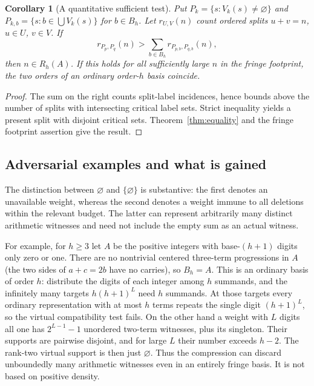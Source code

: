 \documentclass[11pt]{article}
\newtheorem{corollary}[theorem]{Corollary}
\theoremstyle{remark}\newtheorem{remark}[theorem]{Remark}
\begin{document}
\begin{corollary}[A quantitative sufficient test]\label{cor:overlap}
Put $P_k=\{s:V_k(s)\ne\varnothing\}$ and $P_{k,b}=\{s:b\in\bigcup V_k(s)\}$ for $b\in B_h$. Let $r_{U,V}(n)$ count ordered splits $u+v=n$, $u\in U$, $v\in V$. If
\[
 r_{P_p,P_q}(n)>\sum_{b\in B_h}r_{P_{p,b},P_{q,b}}(n),
\]
then $n\in R_h(A)$. If this holds for all sufficiently large $n$ in the fringe footprint, the two orders of an ordinary order-$h$ basis coincide.
\end{corollary}
\begin{proof}
The sum on the right counts split-label incidences, hence bounds above the number of splits with intersecting critical label sets. Strict inequality yields a present split with disjoint critical sets. Theorem~\ref{thm:equality} and the fringe footprint assertion give the result.
\end{proof}

\subsection{Adversarial examples and what is gained}
The distinction between $\varnothing$ and $\{\varnothing\}$ is substantive: the first denotes an unavailable weight, whereas the second denotes a weight immune to all deletions within the relevant budget. The latter can represent arbitrarily many distinct arithmetic witnesses and need not include the empty sum as an actual witness.

For example, for $h\ge3$ let $A$ be the positive integers with base-$(h+1)$ digits only zero or one. There are no nontrivial centered three-term progressions in $A$ (the two sides of $a+c=2b$ have no carries), so $B_h=A$. This is an ordinary basis of order $h$: distribute the digits of each integer among $h$ summands, and the infinitely many targets $h(h+1)^L$ need $h$ summands. At those targets every ordinary representation with at most $h$ terms repeats the single digit $(h+1)^L$, so the virtual compatibility test fails. On the other hand a weight with $L$ digits all one has $2^{L-1}-1$ unordered two-term witnesses, plus its singleton. Their supports are pairwise disjoint, and for large $L$ their number exceeds $h-2$. The rank-two virtual support is then just $\varnothing$. Thus the compression can discard unboundedly many arithmetic witnesses even in an entirely fringe basis. It is not based on positive density.
\end{document}
